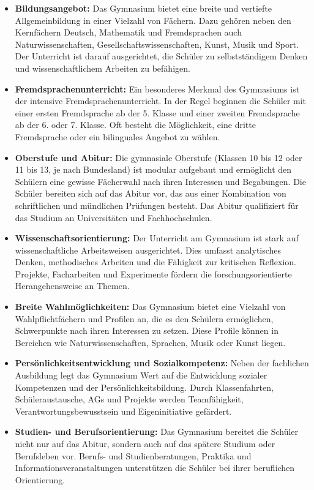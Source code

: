 \begin{itemize}
	\item \textbf{Bildungsangebot:} Das Gymnasium bietet eine breite und vertiefte Allgemeinbildung in einer Vielzahl von F\"{a}chern. Dazu geh\"{o}ren neben den Kernf\"{a}chern Deutsch, Mathematik und Fremdsprachen auch Naturwissenschaften, Gesellschaftswissenschaften, Kunst, Musik und Sport. Der Unterricht ist darauf ausgerichtet, die Sch\"{u}ler zu selbstst\"{a}ndigem Denken und wissenschaftlichem Arbeiten zu bef\"{a}higen.
	
	\item \textbf{Fremdsprachenunterricht:} Ein besonderes Merkmal des Gymnasiums ist der intensive Fremdsprachenunterricht. In der Regel beginnen die Sch\"{u}ler mit einer ersten Fremdsprache ab der 5. Klasse und einer zweiten Fremdsprache ab der 6. oder 7. Klasse. Oft besteht die M\"{o}glichkeit, eine dritte Fremdsprache oder ein bilinguales Angebot zu w\"{a}hlen.
	
	\item \textbf{Oberstufe und Abitur:} Die gymnasiale Oberstufe (Klassen 10 bis 12 oder 11 bis 13, je nach Bundesland) ist modular aufgebaut und erm\"{o}glicht den Sch\"{u}lern eine gewisse F\"{a}cherwahl nach ihren Interessen und Begabungen. Die Sch\"{u}ler bereiten sich auf das Abitur vor, das aus einer Kombination von schriftlichen und m\"{u}ndlichen Pr\"{u}fungen besteht. Das Abitur qualifiziert f\"{u}r das Studium an Universit\"{a}ten und Fachhochschulen.
	
	\item \textbf{Wissenschaftsorientierung:} Der Unterricht am Gymnasium ist stark auf wissenschaftliche Arbeitsweisen ausgerichtet. Dies umfasst analytisches Denken, methodisches Arbeiten und die F\"{a}higkeit zur kritischen Reflexion. Projekte, Facharbeiten und Experimente f\"{o}rdern die forschungsorientierte Herangehensweise an Themen.
	
	\item \textbf{Breite Wahlm\"{o}glichkeiten:} Das Gymnasium bietet eine Vielzahl von Wahlpflichtf\"{a}chern und Profilen an, die es den Sch\"{u}lern erm\"{o}glichen, Schwerpunkte nach ihren Interessen zu setzen. Diese Profile k\"{o}nnen in Bereichen wie Naturwissenschaften, Sprachen, Musik oder Kunst liegen.
	
	\item \textbf{Pers\"{o}nlichkeitsentwicklung und Sozialkompetenz:} Neben der fachlichen Ausbildung legt das Gymnasium Wert auf die Entwicklung sozialer Kompetenzen und der Pers\"{o}nlichkeitsbildung. Durch Klassenfahrten, Sch\"{u}leraustausche, AGs und Projekte werden Teamf\"{a}higkeit, Verantwortungsbewusstsein und Eigeninitiative gef\"{a}rdert.
	
	\item \textbf{Studien- und Berufsorientierung:} Das Gymnasium bereitet die Sch\"{u}ler nicht nur auf das Abitur, sondern auch auf das sp\"{a}tere Studium oder Berufsleben vor. Berufs- und Studienberatungen, Praktika und Informationsveranstaltungen unterst\"{u}tzen die Sch\"{u}ler bei ihrer beruflichen Orientierung.

\end{itemize} 

